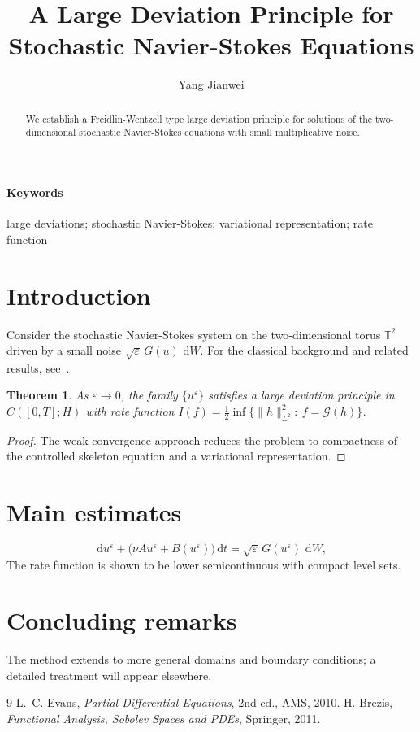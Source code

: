 \documentclass[smallextended]{svjour3}
\title{A Large Deviation Principle for Stochastic Navier-Stokes Equations}
\author{Yang Jianwei}
\date{}
\def\YTfallback{1}
\providecommand{\eps}{\varepsilon}
\newtheorem{theorem}{Theorem}[section]
\newcommand{\dd}{\,\mathrm{d}}
\begin{document}
\maketitle
\ifdefined\YTfallback
\noindent{}
\bigskip
\fi
\begin{abstract}
We establish a Freidlin-Wentzell type large deviation principle for solutions of the two-dimensional stochastic Navier-Stokes equations with small multiplicative noise.
\end{abstract}
\paragraph{Keywords} large deviations; stochastic Navier-Stokes; variational representation; rate function

\section{Introduction}
Consider the stochastic Navier-Stokes system on the two-dimensional torus $\mathbb{T}^2$ driven by a small noise $\sqrt{\eps}\,G(u)\,\dd W$.
For the classical background and related results, see~\cite{Evans,Brezis}.

\begin{theorem}
As $\eps\to0$, the family $\{u^\eps\}$ satisfies a large deviation principle in $C([0,T];H)$ with rate function $I(f)=\frac12\inf\{\|h\|_{L^2}^2:\ f=\mathcal{G}(h)\}$.
\end{theorem}

\begin{proof}
The weak convergence approach reduces the problem to compactness of the controlled skeleton equation and a variational representation.
\end{proof}

\section{Main estimates}
\begin{equation}
\dd u^\eps +\bigl(\nu A u^\eps+B(u^\eps)\bigr)\dd t =\sqrt{\eps}\,G(u^\eps)\,\dd W,
\end{equation}
The rate function is shown to be lower semicontinuous with compact level sets.

\section{Concluding remarks}
The method extends to more general domains and boundary conditions; a detailed
treatment will appear elsewhere.

\begin{thebibliography}{9}
 L.~C. Evans, \emph{Partial Differential Equations}, 2nd ed., AMS, 2010.
 H. Brezis, \emph{Functional Analysis, Sobolev Spaces and PDEs}, Springer, 2011.
\end{thebibliography}
\end{document}
